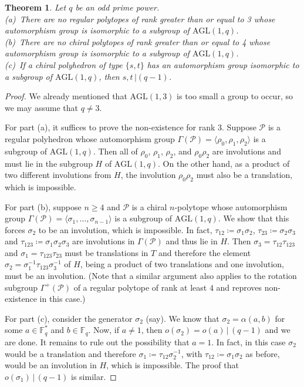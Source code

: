 \documentclass[12pt]{article}
\newtheorem{theorem}{Theorem}[section]
\theoremstyle{definition}\newtheorem{definition}{Definition}[section]
\begin{document}
\begin{theorem}
\label{noregs}
Let $q$ be an odd prime power. \\[.03in]
(a)\ There are no regular polytopes of rank greater than or equal to 3 whose automorphism group is isomorphic to a subgroup of $\mathrm{AGL}(1,q)$.\\[.03in]
(b)\ There are no chiral polytopes of rank greater than or equal to 4 whose automorphism group is isomorphic to a subgroup of $\mathrm{AGL}(1,q)$.\\[.03in]
(c)\ If a chiral polyhedron of type $\{s,t\}$ has an automorphism group isomorphic to a subgroup of $\mathrm{AGL}(1,q)$, then $s,t\,|(q-1)$.
\end{theorem}

\begin{proof}
We already mentioned that $\mathrm{AGL}(1,3)$ is too small a group to occur, so we may assume that $q\neq 3$.

For part (a), it suffices to prove the non-existence for rank 3. Suppose $\mathcal{P}$ is a regular polyhedron whose automorphism group $\Gamma(\mathcal{P})=\langle\rho_0,\rho_1,\rho_2\rangle$ is a subgroup of $\mathrm{AGL}(1,q)$. Then 
all of $\rho_0$, $\rho_1$, $\rho_2$, and $\rho_0\rho_2$ are involutions and must lie in the subgroup $H$ of $\mathrm{AGL}(1, q)$. On the other hand, as a product of two different involutions from $H$, the involution $\rho_0\rho_2$ must also be a translation, which is impossible.

For part (b), suppose $n\geq 4$ and $\mathcal{P}$ is a chiral $n$-polytope whose automorphism group $\Gamma(\mathcal{P})=\langle\sigma_1,\ldots,\sigma_{n-1}\rangle$ is a subgroup of $\mathrm{AGL}(1,q)$. We show that this forces $\sigma_2$ to be an involution, which is impossible. In fact, $\tau_{12}\coloneqq \sigma_1\sigma_2$, $\tau_{23}\coloneqq \sigma_2\sigma_3$ and $\tau_{123}\coloneqq \sigma_1\sigma_2\sigma_3$ are involutions in $\Gamma(\mathcal{P})$ and thus lie in $H$. Then $\sigma_3=\tau_{12}\tau_{123}$ and $\sigma_1=\tau_{123}\tau_{23}$ must be translations in $T$ and therefore the element $\sigma_{2}=\sigma_1^{-1}\tau_{123}\sigma_3^{-1}$ of $H$, being a product of two translations and one involution, must be an involution. (Note that a similar argument also applies to the rotation subgroup $\Gamma^+(\mathcal{P})$ of a regular polytope of rank at least $4$ and reproves non-existence in this case.)

For part (c), consider the generator $\sigma_2$ (say). We know that $\sigma_{2}=\alpha(a,b)$ for some $a\in\mathbb{F}_q^*$ and $b\in\mathbb{F}_q$. Now, if $a\neq 1$, then $o(\sigma_{2})=o(a)\,|\,(q-1)$ and we are done. It remains to rule out the possibility that $a=1$. In fact, in this case $\sigma_2$ would be a translation and therefore $\sigma_{1}\coloneqq \tau_{12}\sigma_{2}^{-1}$, with $\tau_{12}\coloneqq \sigma_1\sigma_2$ as before, would be an involution in $H$, which is impossible. The proof that $o(\sigma_1)\,|\,(q-1)$ is similar.
\end{proof}
\medskip
\end{document}
